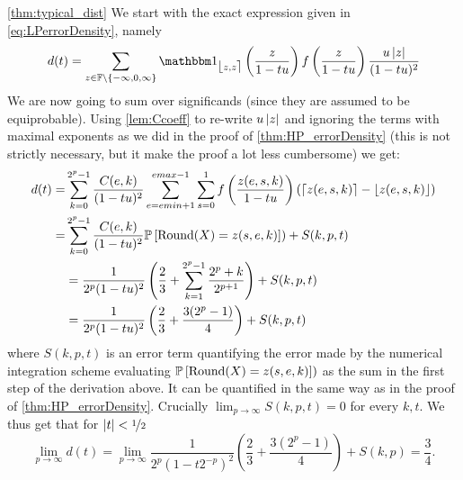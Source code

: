 \begin{myproof}{\cref{thm:typical_dist}}
We start with the exact expression given in \cref{eq:LPerrorDensity}, namely
\begin{align*}
d(t)=\sum_{z\in\F\setminus\{-\infty,0,\infty\}}\one_{\fintvl[z]}\left(\frac{z}{1-t\uro}\right) f\left(\frac{z}{1-t\uro}\right) \frac{\uro\absv{z}}{(1-t\uro)^2}
\end{align*}
We are now going to sum over significands (since they are assumed to be equiprobable). Using \cref{lem:Ccoeff} to re-write $u\left\lvert z\right\rvert$ and ignoring the terms with maximal exponents as we did in the proof of \cref{thm:HP_errorDensity} (this is not strictly necessary, but it make the proof a lot less cumbersome) we get:
\begin{align}
d(t) =&\sum_{k=0}^{2^p-1}\frac{C(e,k)}{(1-tu)^2}\sum_{e=emin+1}^{emax-1}\sum_{s=0}^1 f\left(\frac{z(e,s,k)}{1-tu}\right)(\lceil z(e,s,k) \rceil-\lfloor z(e,s,k) \rfloor)\nonumber
\\
=&\sum_{k=0}^{2^p-1}\frac{C(e,k)}{(1-tu)^2}\mathbb{P}\left[ \mathrm{Round}(X)=z(s,e,k) \right])+ S(k,p, t)\nonumber 
\\
&=\frac{1}{2^p(1-tu)^2}\left(\frac{2}{3}+\sum_{k=1}^{2^p-1}\frac{2^p+k}{2^{p+1}}\right)+ S(k,p,t) \nonumber
\\
&=\frac{1}{2^p(1-tu)^2}\left(\frac{2}{3}+\frac{3(2^{p}-1)}{4}\right)+ S(k,p,t)\label{eq:pdfleq1/2}
\end{align}
where $S(k,p,t)$  is an error term quantifying the error made by the numerical integration scheme evaluating $\mathbb{P}\left[ \mathrm{Round}(X)=z(s,e,k) \right])$ as the sum in the first step of the derivation above. It can be quantified in the same way as in the proof of \cref{thm:HP_errorDensity}. Crucially $\lim_{p\to\infty}S(k,p,t)=0$ for every $k,t$. 
We thus get that for $\left\lvert t\right\rvert<\nicefrac{1}{2}$
\[
\lim_{p\to\infty}d(t) = \lim_{p\to\infty} \frac{1}{2^p(1-t2^{-p})^2}\left(\frac{2}{3}+\frac{3(2^{p}-1)}{4}\right)+ S(k,p) = \frac{3}{4}.
\]


\end{myproof}
